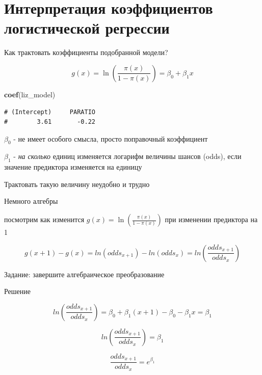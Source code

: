 \documentclass[ignorenonframetext,]{beamer}
\newenvironment{Shaded}{\begin{snugshade}}{\end{snugshade}}
\newcommand{\KeywordTok}[1]{\textcolor[rgb]{0.13,0.29,0.53}{\textbf{{#1}}}}
\newcommand{\NormalTok}[1]{{#1}}
\begin{document}
\section{Интерпретация коэффициентов логистической регрессии}\label{---}

\begin{frame}[fragile]{Как трактовать коэффициенты подобранной модели?}

\[ g(x)=\ln(\frac{\pi(x)}{1-\pi(x)})=\beta_0 + \beta_1x\]

\begin{Shaded}
\begin{Highlighting}[]
\KeywordTok{coef}\NormalTok{(liz_model)}
\end{Highlighting}
\end{Shaded}

\begin{verbatim}
# (Intercept)     PARATIO 
#        3.61       -0.22
\end{verbatim}

\(\beta_0\) - не имеет особого смысла, просто поправочный коэффициент

\(\beta_1\) - \emph{на сколько} единиц изменяется логарифм величины
шансов (odds), если значение предиктора изменяется на единицу

Трактовать такую величину неудобно и трудно

\end{frame}

\begin{frame}{Немного алгебры}

посмотрим как изменится \(g(x)=\ln(\frac{\pi(x)}{1-\pi(x)})\) при
изменении предиктора на 1

\[g(x+1) - g(x) = ln(odds_{x+1}) - ln(odds_x)  = ln(\frac{odds_{x+1}}{odds_x})\]

Задание: завершите алгебраическое преобразование

\end{frame}

\begin{frame}{Решение}

\[ln(\frac{odds_{x+1}}{odds_x}) = \beta_0 + \beta_1(x+1) - \beta_0 - \beta_1x = \beta_1\]

\[ln(\frac{odds_{x+1}}{odds_x}) = \beta_1\]

\[\frac{odds_{x+1}}{odds_x} = e^{\beta_1}\]

\end{frame}
\end{document}
